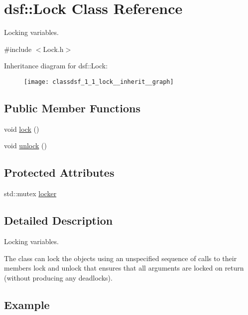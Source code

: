 \hypertarget{classdsf_1_1_lock}{}\section{dsf\+:\+:Lock Class Reference}
\label{classdsf_1_1_lock}


Locking variables.  




{\ttfamily \#include $<$Lock.\+h$>$}



Inheritance diagram for dsf\+:\+:Lock\+:\nopagebreak
\begin{figure}[H]
\begin{center}
\leavevmode
\texttt{[image: classdsf\_1\_1\_lock\_\_inherit\_\_graph]}
\end{center}
\end{figure}
\subsection*{Public Member Functions}
\begin{DoxyCompactItemize}
\item 
void \hyperlink{classdsf_1_1_lock_ae521388d861fe66b9c6e2f09811b0d4b}{lock} ()
\item 
void \hyperlink{classdsf_1_1_lock_a3d03f801920d458b3c3c402a0f4af323}{unlock} ()
\end{DoxyCompactItemize}
\subsection*{Protected Attributes}
\begin{DoxyCompactItemize}
\item 
std\+::mutex \hyperlink{classdsf_1_1_lock_a605f27e33e37dc8b3b920a3272461c44}{locker}
\end{DoxyCompactItemize}


\subsection{Detailed Description}
Locking variables. 

The class can lock the objects using an unspecified sequence of calls to their members lock and unlock that ensures that all arguments are locked on return (without producing any deadlocks).\hypertarget{classdsf_1_1_synchronized_object_eg}{}\subsection{Example}\label{classdsf_1_1_synchronized_object_eg}

